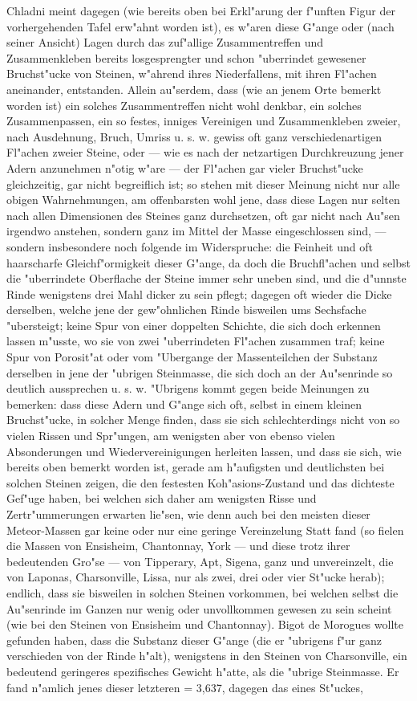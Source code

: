 \documentclass[a4paper, 11pt, oneside, german]{article}
\begin{document}
{Chladni meint dagegen (wie bereits oben bei Erkl"arung der f"unften Figur der vorhergehenden Tafel erw"ahnt worden ist), es w"aren diese G"ange oder (nach seiner Ansicht) Lagen durch das zuf"allige Zusammentreffen und Zusammenkleben bereits losgesprengter und schon "uberrindet gewesener Bruchst"ucke von Steinen, w"ahrend ihres Niederfallens, mit ihren Fl"achen aneinander, entstanden. Allein au"serdem, dass (wie an jenem Orte bemerkt worden ist) ein solches Zusammentreffen nicht wohl denkbar, ein solches Zusammenpassen, ein so festes, inniges Vereinigen und Zusammenkleben zweier, nach Ausdehnung, Bruch, Umriss u. s. w. gewiss oft ganz verschiedenartigen Fl"achen zweier Steine, oder --- wie es nach der netzartigen Durchkreuzung jener Adern anzunehmen n"otig w"are --- der Fl"achen gar vieler Bruchst"ucke gleichzeitig, gar nicht begreiflich ist; so stehen mit dieser Meinung nicht nur alle obigen Wahrnehmungen, am offenbarsten wohl jene, dass diese Lagen nur selten nach allen Dimensionen des Steines ganz durchsetzen, oft gar nicht nach Au"sen irgendwo anstehen, sondern ganz im Mittel der Masse eingeschlossen sind, --- sondern insbesondere noch folgende im Widerspruche: die Feinheit und oft haarscharfe Gleichf"ormigkeit dieser G"ange, da doch die Bruchfl"achen und selbst die "uberrindete Oberflache der Steine immer sehr uneben sind, und die d"unnste Rinde wenigstens drei Mahl dicker zu sein pflegt; dagegen oft wieder die Dicke derselben, welche jene der gew"ohnlichen Rinde bisweilen ums Sechsfache "ubersteigt; keine Spur von einer doppelten Schichte, die sich doch erkennen lassen m"usste, wo sie von zwei "uberrindeten Fl"achen zusammen traf; keine Spur von Porosit"at oder vom "Ubergange der Massenteilchen der Substanz derselben in jene der "ubrigen Steinmasse, die sich doch an der Au"senrinde so deutlich aussprechen u. s. w. "Ubrigens kommt gegen beide Meinungen zu bemerken: dass diese Adern und G"ange sich oft, selbst in einem kleinen Bruchst"ucke, in solcher Menge finden, dass sie sich schlechterdings nicht von so vielen Rissen und Spr"ungen, am wenigsten aber von ebenso vielen Absonderungen und Wiedervereinigungen herleiten lassen, und dass sie sich, wie bereits oben bemerkt worden ist, gerade am h"aufigsten und deutlichsten bei solchen Steinen zeigen, die den festesten Koh"asions-Zustand und das dichteste Gef"uge haben, bei welchen sich daher am wenigsten Risse und Zertr"ummerungen erwarten lie"sen, wie denn auch bei den meisten dieser Meteor-Massen gar keine oder nur eine geringe Vereinzelung Statt fand (so fielen die Massen von Ensisheim, Chantonnay, York --- und diese trotz ihrer bedeutenden Gro"se --- von Tipperary, Apt, Sigena, ganz und unvereinzelt, die von Laponas, Charsonville, Lissa, nur als zwei, drei oder vier St"ucke herab); endlich, dass sie bisweilen in solchen Steinen vorkommen, bei welchen selbst die Au"senrinde im Ganzen nur wenig oder unvollkommen gewesen zu sein scheint (wie bei den Steinen von Ensisheim und Chantonnay). Bigot de Morogues wollte gefunden haben, dass die Substanz dieser G"ange (die er "ubrigens f"ur ganz verschieden von der Rinde h"alt), wenigstens in den Steinen von Charsonville, ein bedeutend geringeres spezifisches Gewicht h"atte, als die "ubrige Steinmasse. Er fand n"amlich jenes dieser letzteren = 3,637, dagegen das eines St"uckes, }
\end{document}
